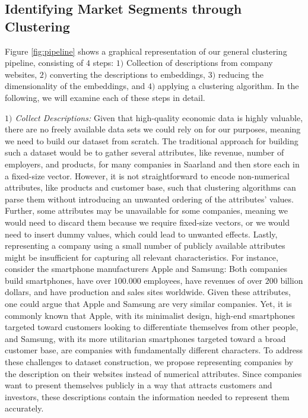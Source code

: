 \documentclass[conference]{IEEEtran}
\newcommand{\pe}[1]{\todo[inline, backgroundcolor=green]{PE: #1}}
\begin{document}
\subsection{Identifying Market Segments through Clustering}
Figure \ref{fig:pipeline} shows a graphical representation of our general clustering pipeline, consisting of $4$ steps: $1)$ Collection of descriptions from company websites, $2)$ converting the descriptions to embeddings, $3)$ reducing the dimensionality of the embeddings, and $4)$ applying a clustering algorithm. In the following, we will examine each of these steps in detail.

\textit{$1)$ Collect Descriptions:} Given that high-quality economic data is highly valuable, there are no freely available data sets we could rely on for our purposes, meaning we need to build our dataset from scratch. \pe{TODO: rephrase} The traditional approach for building such a dataset would be to gather several attributes, like revenue, number of employers, and products, for many companies in Saarland and then store each in a fixed-size vector. \pe{TODO: backup with accepted approach} However, it is not straightforward to encode non-numerical attributes, like products and customer base, such that clustering algorithms can parse them without introducing an unwanted ordering of the attributes' values. 
Further, some attributes may be unavailable for some companies, meaning we would need to discard them because we require fixed-size vectors, or we would need to insert dummy values, which could lead to unwanted effects.
Lastly, representing a company using a small number of publicly available attributes might be insufficient for capturing all relevant characteristics. For instance, consider the smartphone manufacturers Apple and Samsung: Both companies build smartphones, have over $100.000$ employees, have revenues of over $200$ billion dollars, and have production and sales sites worldwide. Given these attributes, one could argue that Apple and Samsung are very similar companies. Yet, it is commonly known that Apple, with its minimalist design, high-end smartphones targeted toward customers looking to differentiate themselves from other people, and Samsung, with its more utilitarian smartphones targeted toward a broad customer base, are companies with fundamentally different characters.
To address these challenges to dataset construction, we propose representing companies by the description on their websites instead of numerical attributes. Since companies want to present themselves publicly in a way that attracts customers and investors, these descriptions contain the information needed to represent them accurately. 
\end{document}

